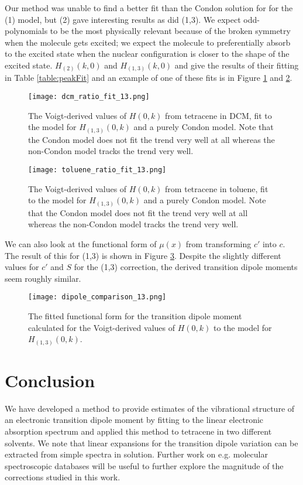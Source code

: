 Our method was unable to find a better fit than the Condon solution for for the (1) model, but (2) gave interesting results as did (1,3).  We expect odd-polynomials to be the most physically relevant because of the broken symmetry when the molecule gets excited; we expect the molecule to preferentially absorb to the excited state when the nuclear configuration is closer to the shape of the excited state. $H_{(2)}(k,0)$ and $H_{(1,3)}(k,0)$ and give the results of their fitting in Table \ref{table:peakFit} and an example of one of these fits is in Figure \ref{fig:dcm_ratio13_fit} and \ref{fig:toluene_ratio13_fit}.

\begin{figure}
   \texttt{[image: dcm\_ratio\_fit\_13.png]}
   \caption{The Voigt-derived values of $H(0,k)$ from tetracene in DCM, fit to the model for $H_{(1,3)}(0,k)$ and a purely Condon model.  Note that the Condon model does not fit the trend very well at all whereas the non-Condon model tracks the trend very well.}
	\label{fig:dcm_ratio13_fit}
\end{figure}
\begin{figure}
   \texttt{[image: toluene\_ratio\_fit\_13.png]}
   \caption{The Voigt-derived values of $H(0,k)$ from tetracene in toluene, fit to the model for $H_{(1,3)}(0,k)$ and a purely Condon model.  Note that the Condon model does not fit the trend very well at all whereas the non-Condon model tracks the trend very well.}
	\label{fig:toluene_ratio13_fit}
\end{figure}

We can also look at the functional form of $\mu(x)$ from transforming $c'$ into $c$.  The result of this for (1,3) is shown in Figure \ref{fig:mu_fit_comparison}.  Despite the slightly different values for $c'$ and $S$ for the (1,3) correction, the derived transition dipole moments seem roughly similar.

\begin{figure}
   \texttt{[image: dipole\_comparison\_13.png]}
   \caption{The fitted functional form for the transition dipole moment calculated for the Voigt-derived values of $H(0,k)$ to the model for $H_{(1,3)}(0,k)$.}
	\label{fig:mu_fit_comparison}
\end{figure}


\section{Conclusion}
We have developed a method to provide estimates of the vibrational structure of an electronic transition dipole moment by fitting to the linear electronic absorption spectrum and applied this method to tetracene in two different solvents.  We note that linear expansions for the transition dipole variation can be extracted from simple spectra in solution. Further work on e.g. molecular spectroscopic databases will be useful to further explore the magnitude of the corrections studied in this work.


